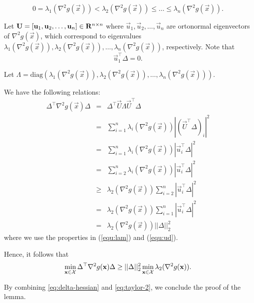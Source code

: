 \begin{equation}
0=\lambda_1(\nabla^2 g(\vec{x})) < \lambda_2(\nabla^2 g(\vec{x})) \le \dots\le \lambda_n(\nabla^2 g(\vec{x})).
\label{equ:lam}
\end{equation}

Let $\mathbf{U} = [\mathbf{u}_1,\mathbf{u}_2,\ldots,\mathbf{u}_n] \in \mathbf{R}^{n\times n}$ where $\vec{u}_1,\vec{u}_2,\ldots,\vec{u}_n$ are ortonormal eigenvectors of $\nabla^2 g(\vec{x})$, which correspond to eigenvalues $\lambda_1(\nabla^2 g(\vec{x})), \lambda_2(\nabla^2 g(\vec{x})), \ldots, \lambda_n(\nabla^2 g(\vec{x}))$, respectively. Note that 
\begin{equation}
\vec{u}_1^\top \Delta = 0. 
\label{equ:ud}
\end{equation}

Let $\Lambda = \mathrm{diag}(\lambda_1(\nabla^2 g(\vec{x})), \lambda_2(\nabla^2 g(\vec{x})), \ldots, \lambda_n(\nabla^2 g(\vec{x})))$.

We have the following relations:
\begin{eqnarray*}
\Delta^\top \nabla^2 g(\vec{x})\Delta & = & \Delta^\top \vec{U}\Lambda\vec{U}^\top\Delta\\
&=& \sum_{i=1}^n \lambda_i(\nabla^2 g(\vec{x}))|(\vec{U}^\top\Delta)_i|^2\\
&=& \sum_{i=1}^n \lambda_i(\nabla^2 g(\vec{x}))|\vec{u}_i^\top\Delta|^2\\
&=& \sum_{i=2}^n \lambda_i(\nabla^2 g(\vec{x}))|\vec{u}_i^\top\Delta|^2\\
&\geq & \lambda_2(\nabla^2 g(\vec{x})) \sum_{i=2}^n |\vec{u}_i^\top\Delta|^2\\
&= & \lambda_2(\nabla^2 g(\vec{x})) \sum_{i=1}^n |\vec{u}_i^\top\Delta|^2\\
&= & \lambda_2(\nabla^2 g(\vec{x})) ||\Delta||_2^2
\end{eqnarray*}
where we use the properties in (\ref{equ:lam}) and (\ref{equ:ud}).

Hence, it follows that
\begin{equation}
\min_{\mathbf{x}\in {\mathcal X}}\Delta^\top \nabla^2 g(\mathbf{x})\Delta \geq ||\Delta||_2^2 \min_{\mathbf{x}\in {\mathcal X}} \lambda_2(\nabla^2 g(\mathbf{x})).
\label{eq:delta-hessian}
\end{equation}

By combining \eqref{eq:delta-hessian} and \eqref{eq:taylor-2}, we conclude the proof of the lemma.



